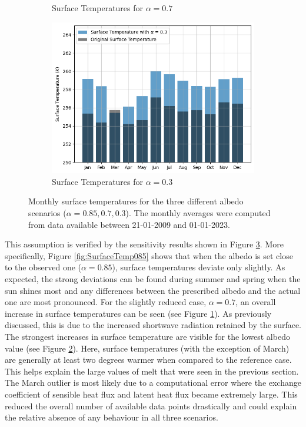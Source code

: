 \documentclass{article}
\begin{document}
\begin{figure}[h!]
\begin{subfigure}{0.49\textwidth}
      \caption{Surface Temperatures for $\alpha = 0.7$}
      \label{fig:SurfaceTemp07}
  \end{subfigure}
  
  \vspace{1cm}  %
  \begin{subfigure}{0.5\textwidth}
      \centering
      \includegraphics[width=\linewidth]{figures/Bar_Tsurf_03.png}  %
      \caption{Surface Temperatures for $\alpha = 0.3$}
      \label{fig:SurfaceTemp03}
  \end{subfigure}
  
  \caption{Monthly surface temperatures for the three different albedo scenarios ($\alpha = 0.85, 0.7, 0.3$). The monthly averages were computed from data available between 21-01-2009 and 01-01-2023.}
  \label{fig:SurfaceTemp}
\end{figure}
This assumption is verified by the sensitivity results shown in Figure \ref{fig:SurfaceTemp}. 
More specifically, Figure \ref{fig:SurfaceTemp085} shows that when the albedo is set close to the observed one ($\alpha = 0.85$), surface temperatures deviate only slightly. 
As expected, the strong deviations can be found during summer and spring when the sun shines most and any differences between the prescribed albedo and the actual one are most pronounced. 
For the slightly reduced case, $\alpha = 0.7$, an overall increase in surface temperatures can be seen (see Figure \ref{fig:SurfaceTemp07}). 
As previously discussed, this is due to the increased shortwave radiation retained by the surface. 
The strongest increases in surface temperature are visible for the lowest albedo value (see Figure \ref{fig:SurfaceTemp03}).
Here, surface temperatures (with the exception of March) are generally at least two degrees warmer when compared to the reference case. 
This helps explain the large values of melt that were seen in the previous section. 
The March outlier is most likely due to a computational error where the exchange coefficient of sensible heat flux and latent heat flux became extremely large. 
This reduced the overall number of available data points drastically and could explain the relative absence of any behaviour in all three scenarios. 
\end{document}
